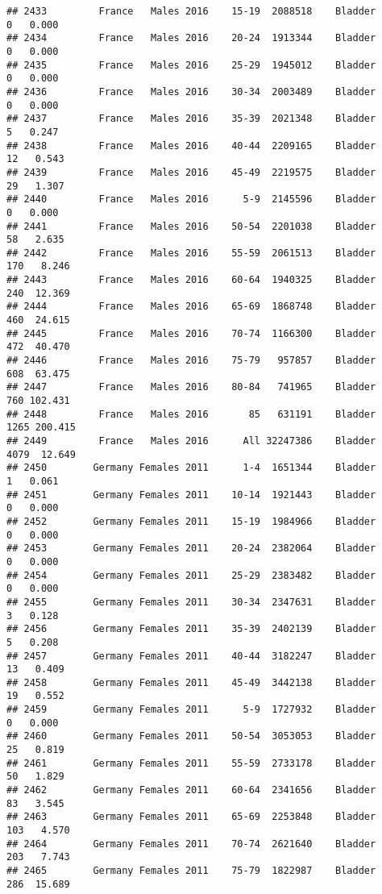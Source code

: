 \documentclass[
]{article}
\begin{document}
\begin{verbatim}
## 2433         France   Males 2016    15-19  2088518    Bladder      0   0.000
## 2434         France   Males 2016    20-24  1913344    Bladder      0   0.000
## 2435         France   Males 2016    25-29  1945012    Bladder      0   0.000
## 2436         France   Males 2016    30-34  2003489    Bladder      0   0.000
## 2437         France   Males 2016    35-39  2021348    Bladder      5   0.247
## 2438         France   Males 2016    40-44  2209165    Bladder     12   0.543
## 2439         France   Males 2016    45-49  2219575    Bladder     29   1.307
## 2440         France   Males 2016      5-9  2145596    Bladder      0   0.000
## 2441         France   Males 2016    50-54  2201038    Bladder     58   2.635
## 2442         France   Males 2016    55-59  2061513    Bladder    170   8.246
## 2443         France   Males 2016    60-64  1940325    Bladder    240  12.369
## 2444         France   Males 2016    65-69  1868748    Bladder    460  24.615
## 2445         France   Males 2016    70-74  1166300    Bladder    472  40.470
## 2446         France   Males 2016    75-79   957857    Bladder    608  63.475
## 2447         France   Males 2016    80-84   741965    Bladder    760 102.431
## 2448         France   Males 2016       85   631191    Bladder   1265 200.415
## 2449         France   Males 2016      All 32247386    Bladder   4079  12.649
## 2450        Germany Females 2011      1-4  1651344    Bladder      1   0.061
## 2451        Germany Females 2011    10-14  1921443    Bladder      0   0.000
## 2452        Germany Females 2011    15-19  1984966    Bladder      0   0.000
## 2453        Germany Females 2011    20-24  2382064    Bladder      0   0.000
## 2454        Germany Females 2011    25-29  2383482    Bladder      0   0.000
## 2455        Germany Females 2011    30-34  2347631    Bladder      3   0.128
## 2456        Germany Females 2011    35-39  2402139    Bladder      5   0.208
## 2457        Germany Females 2011    40-44  3182247    Bladder     13   0.409
## 2458        Germany Females 2011    45-49  3442138    Bladder     19   0.552
## 2459        Germany Females 2011      5-9  1727932    Bladder      0   0.000
## 2460        Germany Females 2011    50-54  3053053    Bladder     25   0.819
## 2461        Germany Females 2011    55-59  2733178    Bladder     50   1.829
## 2462        Germany Females 2011    60-64  2341656    Bladder     83   3.545
## 2463        Germany Females 2011    65-69  2253848    Bladder    103   4.570
## 2464        Germany Females 2011    70-74  2621640    Bladder    203   7.743
## 2465        Germany Females 2011    75-79  1822987    Bladder    286  15.689

\end{verbatim}
\end{document}
